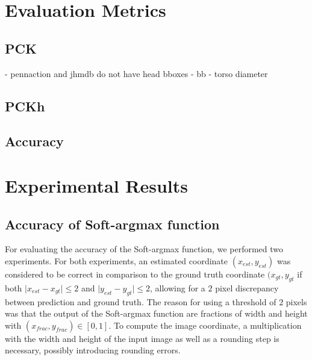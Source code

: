 \section{Evaluation Metrics}
\subsection{PCK}
\label{sec:exp-pck}
- pennaction and jhmdb do not have head bboxes
- bb
- torso diameter

\subsection{PCKh}
\label{sec:exp-pckh}

\subsection{Accuracy}


\section{Experimental Results}
\subsection{Accuracy of Soft-argmax function}
For evaluating the accuracy of the Soft-argmax function, we performed two experiments.
For both experiments, an estimated coordinate $(x_{est},y_{est})$ was considered to be correct in comparison to the ground truth coordinate $(x_{gt}, y_{gt}$ if both $\lvert x_{est} - x_{gt} \rvert \leq 2$ and $\lvert y_{est} - y_{gt} \rvert \leq 2$, allowing for a $2$ pixel discrepancy between prediction and ground truth.
The reason for using a threshold of $2$ pixels was that the output of the Soft-argmax function are fractions of width and height with $(x_{frac}, y_{frac}) \in [0,1]$.
To compute the image coordinate, a multiplication with the width and height of the input image as well as a rounding step is necessary, possibly introducing rounding errors.

